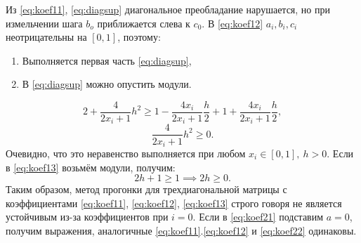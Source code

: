 \documentclass[a4paper,12pt]{article}
\begin{document}
\begin{flushleft}
  Из \eqref{eq:koef11}, \eqref{eq:diagsup} диагональное преобладание нарушается, но при измельчении шага $b_o$ приближается слева к $c_0$.\linebreak\linebreak
  В \eqref{eq:koef12} $a_i, b_i, c_i$ неотрицательны на $[0,1]$, поэтому: \begin{enumerate}\item Выполняется первая часть \eqref{eq:diagsup}, \item В \eqref{eq:diagsup} можно опустить модули.\end{enumerate}
  \begin{equation*}
    2 + \frac{4}{2x_i+1}h^2 \ge 1 - \frac{4x_i}{2x_i+1}\frac{h}{2} + 1 + \frac{4x_i}{2x_i+1}\frac{h}{2},
  \end{equation*}
  \begin{equation*}
    \frac{4}{2x_i+1}h^2 \ge 0.
  \end{equation*}
  Очевидно, что это неравенство выполняется при любом $x_i \in [0,1],~h > 0$.\linebreak\linebreak
  Если в \eqref{eq:koef13} возьмём модули, получим:
  \begin{equation}\label{eq:k1c}
    2h+1 \ge 1 \implies 2h \ge 0.
  \end{equation}
  Таким образом, метод прогонки для трехдиагональной матрицы с коэффициентами \eqref{eq:koef11}, \eqref{eq:koef12}, \eqref{eq:koef13} строго говоря не является устойчивым из-за коэффициентов при $i=0$. \linebreak\linebreak
  Если в \eqref{eq:koef21} подставим $a=0$, получим выражения, аналогичные \eqref{eq:koef11}.\linebreak\linebreak\eqref{eq:koef12} и \eqref{eq:koef22} одинаковы.\linebreak\linebreak


\end{flushleft}
\end{document}
